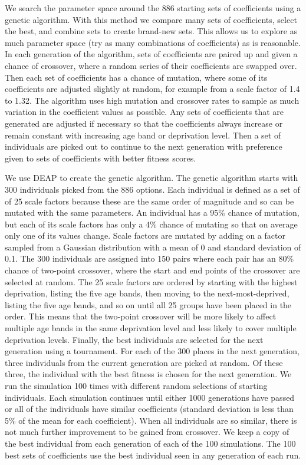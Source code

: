 \documentclass[12pt]{extarticle}
\begin{document}
We search the parameter space around the 886 starting sets of coefficients using a genetic algorithm. With this method we compare many sets of coefficients, select the best, and combine sets to create brand-new sets. This allows us to explore as much parameter space (try as many combinations of coefficients) as is reasonable.
% 
In each generation of the algorithm, sets of coefficients are paired up and given a chance of crossover, where a random series of their coefficients are swapped over. Then each set of coefficients has a chance of mutation, where some of its coefficients are adjusted slightly at random, for example from a scale factor of 1.4 to 1.32. The algorithm uses high mutation and crossover rates to sample as much variation in the coefficient values as possible.
Any sets of coefficients that are generated are adjusted if necessary so that the coefficients always increase or remain constant with increasing age band or deprivation level.
Then a set of individuals are picked out to continue to the next generation with preference given to sets of coefficients with better fitness scores.

We use DEAP \cite{DEAP_JMLR2012} to create the genetic algorithm.
The genetic algorithm starts with 300 individuals picked from the 886 options. 
Each individual is defined as a set of of 25 scale factors because these are the same order of magnitude and so can be mutated with the same parameters.
An individual has a 95\% chance of mutation, but each of its scale factors has only a 4\% chance of mutating so that on average only one of its values change. Scale factors are mutated by adding on a factor sampled from a Gaussian distribution with a mean of 0 and standard deviation of 0.1.
The 300 individuals are assigned into 150 pairs where each pair has an 80\% chance of two-point crossover, where the start and end points of the crossover are selected at random. The 25 scale factors are ordered by starting with the highest deprivation, listing the five age bands, then moving to the next-most-deprived, listing the five age bands, and so on until all 25 groups have been placed in the order. This means that the two-point crossover will be more likely to affect multiple age bands in the same deprivation level and less likely to cover multiple deprivation levels.
Finally, the best individuals are selected for the next generation using a tournament. For each of the 300 places in the next generation, three individuals from the current generation are picked at random. Of these three, the individual with the best fitness is chosen for the next generation. 
% 
We run the simulation 100 times with different random selections of starting individuals.
Each simulation continues until either 1000 generations have passed or all of the individuals have similar coefficients (standard deviation is less than 5\% of the mean for each coefficient). When all individuals are so similar, there is not much further improvement to be gained from crossover.
We keep a copy of the best individual from each generation of each of the 100 simulations.
The 100 best sets of coefficients use the best individual seen in any generation of each run.
\end{document}
